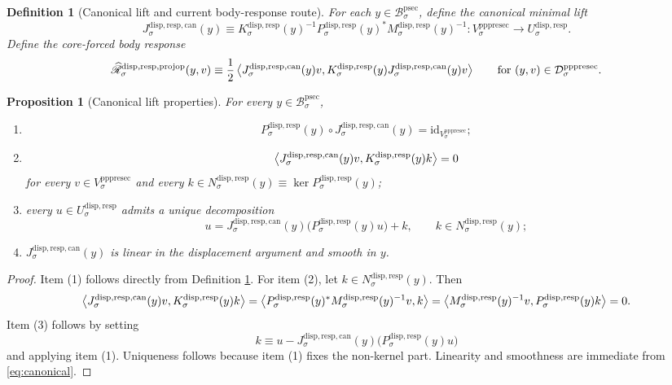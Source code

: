 \documentclass[11pt]{article}
\newcommand{\ProtoSectionBody}[1]{\mathcal B_{#1}^{\mathrm{psec}}}
\newcommand{\PrePreProtoSectionVertical}[1]{V_{#1}^{\mathrm{pppresec}}}
\newcommand{\PrePreProtoSectionResidualBody}[1]{\mathcal D_{#1}^{\mathrm{pppresec}}}
\newcommand{\SubstrateCarrier}[1]{U_{#1}^{\mathrm{disp,resp}}}
\newcommand{\SubstrateProjection}[1]{P_{#1}^{\mathrm{disp,resp}}}
\newcommand{\SubstrateOperator}[1]{K_{#1}^{\mathrm{disp,resp}}}
\newcommand{\SubstrateKernel}[1]{N_{#1}^{\mathrm{disp,resp}}}
\newcommand{\SchurResponse}[1]{M_{#1}^{\mathrm{disp,resp}}}
\newcommand{\CanonicalLift}[1]{J_{#1}^{\mathrm{disp,resp,can}}}
\newcommand{\CoreForcedBodyResponse}[1]{\widehat{\mathscr R}_{#1}^{\mathrm{disp,resp,projop}}}
\newtheorem{definition}{Definition}
\newtheorem{proposition}{Proposition}
\begin{document}
\begin{definition}[Canonical lift and current body-response route]
\label{def:canonical}
For each \(y\in\ProtoSectionBody{\sigma}\), define the \emph{canonical minimal lift}
\begin{equation}
\CanonicalLift{\sigma}(y)
\equiv
\SubstrateOperator{\sigma}(y)^{-1}\SubstrateProjection{\sigma}(y)^*
\SchurResponse{\sigma}(y)^{-1}
:
\PrePreProtoSectionVertical{\sigma}\to\SubstrateCarrier{\sigma}.
\label{eq:canonical}
\end{equation}
Define the \emph{core-forced body response}
\begin{equation}
\CoreForcedBodyResponse{\sigma}(y,v)
\equiv
\frac{1}{2}
\ev{
\CanonicalLift{\sigma}(y)v,
\SubstrateOperator{\sigma}(y)\CanonicalLift{\sigma}(y)v
}
\qquad
\text{for }
(y,v)\in\PrePreProtoSectionResidualBody{\sigma}.
\label{eq:coreresponse}
\end{equation}
\end{definition}

\begin{proposition}[Canonical lift properties]
\label{prop:canonical}
For every \(y\in\ProtoSectionBody{\sigma}\),
\begin{enumerate}
    \item
    \[
    \SubstrateProjection{\sigma}(y)\circ\CanonicalLift{\sigma}(y)
    =
    \mathrm{id}_{\PrePreProtoSectionVertical{\sigma}};
    \]
    \item
    \[
    \ev{
    \CanonicalLift{\sigma}(y)v,
    \SubstrateOperator{\sigma}(y)k
    }
    =
    0
    \]
    for every \(v\in\PrePreProtoSectionVertical{\sigma}\) and every \(k\in\SubstrateKernel{\sigma}(y)\equiv\ker\SubstrateProjection{\sigma}(y)\);
    \item every \(u\in\SubstrateCarrier{\sigma}\) admits a unique decomposition
    \[
    u
    =
    \CanonicalLift{\sigma}(y)\bigl(\SubstrateProjection{\sigma}(y)u\bigr)
    +
    k,
    \qquad
    k\in\SubstrateKernel{\sigma}(y);
    \]
    \item \(\CanonicalLift{\sigma}(y)\) is linear in the displacement argument and smooth in \(y\).
\end{enumerate}
\end{proposition}

\begin{proof}
Item (1) follows directly from Definition \ref{def:canonical}. For item (2), let \(k\in\SubstrateKernel{\sigma}(y)\). Then
\[
\ev{
\CanonicalLift{\sigma}(y)v,
\SubstrateOperator{\sigma}(y)k
}
=
\ev{
\SubstrateProjection{\sigma}(y)^*\SchurResponse{\sigma}(y)^{-1}v,
k
}
=
\ev{
\SchurResponse{\sigma}(y)^{-1}v,
\SubstrateProjection{\sigma}(y)k
}
=
0.
\]
Item (3) follows by setting
\[
k\equiv u-\CanonicalLift{\sigma}(y)\bigl(\SubstrateProjection{\sigma}(y)u\bigr)
\]
and applying item (1). Uniqueness follows because item (1) fixes the non-kernel part. Linearity and smoothness are immediate from \eqref{eq:canonical}.
\end{proof}
\end{document}
